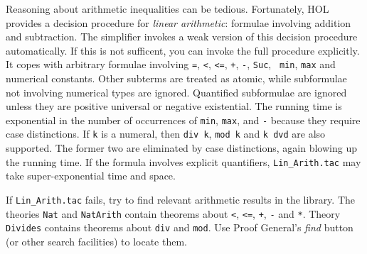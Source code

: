 Reasoning about arithmetic inequalities can be tedious.  Fortunately, HOL
provides a decision procedure for \emph{linear arithmetic}: formulae involving
addition and subtraction. The simplifier invokes a weak version of this
decision procedure automatically. If this is not sufficent, you can invoke the
full procedure  explicitly.  It copes with arbitrary
formulae involving {\tt=}, {\tt<}, {\tt<=}, {\tt+}, {\tt-}, {\tt Suc}, {\tt
  min}, {\tt max} and numerical constants. Other subterms are treated as
atomic, while subformulae not involving numerical types are ignored. Quantified
subformulae are ignored unless they are positive universal or negative
existential. The running time is exponential in the number of
occurrences of {\tt min}, {\tt max}, and {\tt-} because they require case
distinctions.
If {\tt k} is a numeral, then {\tt div k}, {\tt mod k} and
{\tt k dvd} are also supported. The former two are eliminated
by case distinctions, again blowing up the running time.
If the formula involves explicit quantifiers, \texttt{Lin_Arith.tac} may take
super-exponential time and space.

If \texttt{Lin_Arith.tac} fails, try to find relevant arithmetic results in
the library.  The theories \texttt{Nat} and \texttt{NatArith} contain
theorems about {\tt<}, {\tt<=}, \texttt{+}, \texttt{-} and \texttt{*}.
Theory \texttt{Divides} contains theorems about \texttt{div} and
\texttt{mod}.  Use Proof General's \emph{find} button (or other search
facilities) to locate them.



